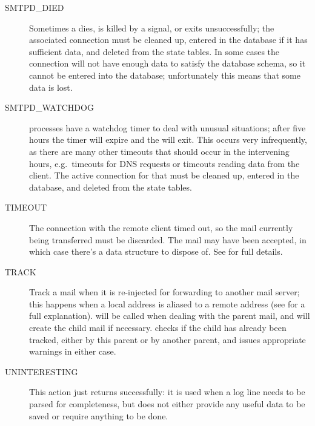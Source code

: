 \begin{description}
    \item [SMTPD\_DIED] Sometimes a  dies, is killed by a
        signal, or exits unsuccessfully; the associated connection must be
        cleaned up, entered in the database if it has sufficient data, and
        deleted from the state tables.  In some cases the connection will
        not have enough data to satisfy the database schema, so it cannot
        be entered into the database; unfortunately this means that some
        data is lost.

    \item [SMTPD\_WATCHDOG]  processes have a watchdog timer
        to deal with unusual situations; after five hours the timer will
        expire and the  will exit.  This occurs very
        infrequently, as there are many other timeouts that should occur in
        the intervening hours, e.g.\ timeouts for DNS requests or timeouts
        reading data from the client.  The active connection for that
         must be cleaned up, entered in the database, and
        deleted from the state tables.

    \item [TIMEOUT] The connection with the remote client timed out, so the
        mail currently being transferred must be discarded.  The mail may
        have been accepted, in which case there's a data structure to
        dispose of.  See  for full
        details.

    \item [TRACK] Track a mail when it is re-injected for forwarding to
        another mail server; this happens when a local address is aliased
        to a remote address (see  for
        a full explanation).   will be called when dealing
        with the parent mail, and will create the child mail if necessary.
         checks if the child has already been tracked, either
        by this parent or by another parent, and issues appropriate
        warnings in either case.

    \item [UNINTERESTING] This action just returns successfully: it is used
        when a log line needs to be parsed for completeness, but does not
        either provide any useful data to be saved or require anything to
        be done.

\end{description}

